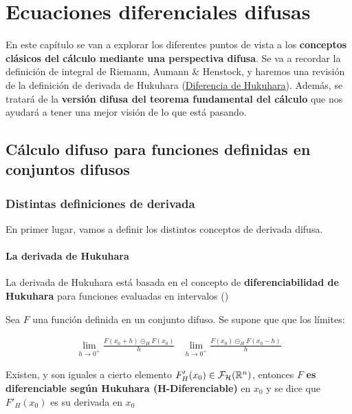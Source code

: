 
\chapter{Ecuaciones diferenciales difusas}
En este capítulo se van a explorar los diferentes puntos de vista a los \textbf{conceptos clásicos del cálculo mediante una perspectiva difusa}. Se va a recordar la definición de integral de Riemann, Aumann \& Henstock, y haremos una revisión de la definición de derivada de Hukuhara (\hyperref[def:hukukara]{Diferencia de Hukuhara}). Además, se tratará de la \textbf{versión difusa del teorema fundamental del cálculo} que nos ayudará a tener una mejor visión de lo que está pasando.

\section{Cálculo difuso para funciones definidas en conjuntos difusos}
\subsection{Distintas definiciones de derivada}
En primer lugar, vamos a definir los distintos conceptos de derivada difusa.

\subsubsection{La derivada de Hukuhara}
La derivada de Hukuhara está basada en el concepto de \textbf{diferenciabilidad de Hukuhara} para funciones evaluadas en intervalos (\cite{derivatehukuhara})

\begin{definicion}
  Sea $F$ una función definida en un conjunto difuso. Se supone que que los límites:
  
  \[
  \begin{array}{c||c}
    \lim\limits_{h \rightarrow 0^+} \frac{F(x_0 + h) \circleddash_H F(x_0)}{h} & \lim\limits_{h \rightarrow 0^+} \frac{F(x_0) \circleddash_H F(x_0 - h)}{h}
  \end{array}
  \]
  
  Existen, y son iguales a cierto elemento $F'_H(x_0) \in \mathcal{F}_\mathcal{H}(\mathbb R^n)$, entonces $F$ \textbf{es diferenciable según Hukuhara (H-Diferenciable)} en $x_0$ y se dice que $F'_H(x_0)$ es su derivada en $x_0$ 
\end{definicion}

